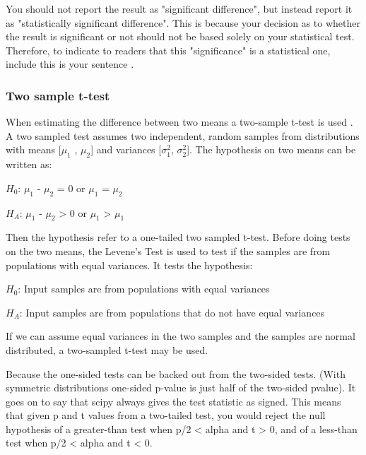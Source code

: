 You should not report the result as "significant difference", but instead report it as "statistically significant difference". This is because your decision as to whether the result is significant or not should not be based solely on your statistical test. Therefore, to indicate to readers that this "significance" is a statistical one, include this is your sentence \citep{LundResearchLtd2013a}. 


\subsubsection{Two sample t-test}\label{sec:t-test}
When estimating the difference between two means a two-sample t-test is used \citep{Walpole2012}. A two sampled test assumes two independent, random samples from distributions with means [$\mu_{1}$ , $\mu_{2}$] and variances [$\sigma_{1}^{2}$, $\sigma_{2}^{2}$]. %
The hypothesis on two means can be written as:\newline

\centerline{$H_{0}$: $\mu_{1}$ - $\mu_{2}$ = 0 or $\mu_{1}$ = $\mu_{2}$} 
\centerline{$H_{A}$: $\mu_{1}$ - $\mu_{2}$ > 0 or $\mu_{1}$ > $\mu_{1}$}
 
Then the hypothesis refer to a one-tailed two sampled t-test. Before doing tests on the two means, the Levene's Test is used to test if the samples are from populations with equal variances. It tests the hypothesis:\newline %

\centerline{$H_{0}$: Input samples are from populations with equal variances} 
\centerline{$H_{A}$: Input samples are from populations that do not have equal variances}

If we can assume equal variances in the two samples and the samples are normal distributed, a two-sampled t-test may be used. 

Because the one-sided tests can be backed out from the two-sided tests. (With symmetric distributions one-sided p-value is just half of the two-sided pvalue). It goes on to say that scipy always gives the test statistic as signed. This means that given p and t values from a two-tailed test, you would reject the null hypothesis of a greater-than test when p/2 < alpha and t > 0, and of a less-than test when p/2 < alpha and t < 0. %

